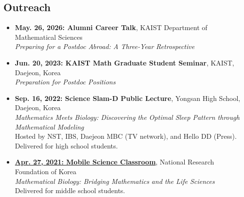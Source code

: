 \documentclass[margin,line]{res}
\begin{document}
\begin{resume}
\section{\sc Outreach}
\begin{itemize}[leftmargin=0pt, label={}]
    \item \textbf{May. 26, 2026: Alumni Career Talk}, KAIST Department of Mathematical Sciences \\
    \textit{Preparing for a Postdoc Abroad: A Three-Year Retrospective}
    \item \textbf{Jun. 20, 2023: KAIST Math Graduate Student Seminar}, KAIST, Daejeon, Korea \\
    \textit{Preparation for Postdoc Positions}
    \item \textbf{Sep. 16, 2022: Science Slam-D Public Lecture}, Yongsan High School, Daejeon, Korea \\
    \textit{Mathematics Meets Biology: Discovering the Optimal Sleep Pattern through Mathematical Modeling} \\
    Hosted by NST, IBS, Daejeon MBC (TV network), and Hello DD (Press). Delivered for high school students.
    \item \href{https://youtu.be/MyAU7jTFzMc?feature=shared}{\textbf{Apr. 27, 2021: Mobile Science Classroom}}, National Research Foundation of Korea \\
    \textit{Mathematical Biology: Bridging Mathematics and the Life Sciences} \\
    Delivered for middle school students.
\end{itemize}

\vspace{-8pt}
\end{resume}
\end{document}
